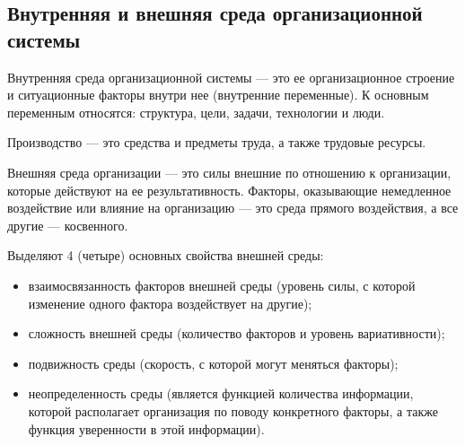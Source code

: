 \documentclass[a4paper,12pt,oneside,final]{extarticle}
\numberwithin{equation}{section}
\begin{document}
\subsection{Внутренняя и внешняя среда организационной системы}
Внутренняя среда организационной системы --- это ее организационное строение и ситуационные факторы внутри нее (внутренние переменные).
К основным переменным относятся: структура, цели, задачи, технологии и люди.

Производство --- это средства и предметы труда, а также трудовые ресурсы.

Внешняя среда организации --- это силы внешние по отношению к организации, которые действуют на ее результативность. 
Факторы, оказывающие немедленное воздействие или влияние на организацию --- это среда прямого воздействия, а все другие --- косвенного.

Выделяют 4 (четыре) основных свойства внешней среды: 
\begin{itemize}
	\item взаимосвязанность факторов внешней среды (уровень силы, с которой изменение одного фактора воздействует на другие); 
	\item сложность внешней среды (количество факторов и уровень вариативности); 
	\item подвижность среды (скорость, с которой могут меняться факторы); 
	\item неопределенность среды (является функцией количества информации, которой располагает организация по поводу конкретного факторы, а также функция уверенности в этой информации). 
\end{itemize}
\end{document}
